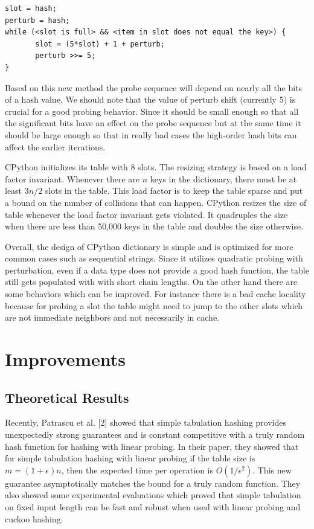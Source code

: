 \documentclass[11pt]{article}
\begin{document}
\begin{verbatim}
slot = hash;
perturb = hash;
while (<slot is full> && <item in slot does not equal the key>) {
       slot = (5*slot) + 1 + perturb;
       perturb >>= 5;
}
\end{verbatim}

Based on this new method the probe sequence will depend on nearly all the bits
of a hash value. We should note that the value of  perturb shift (currently 5)
is crucial for a good probing behavior. Since it should be small enough so that
all the significant bits have an  effect on the probe sequence but at the same
time it should be large enough so that in really bad cases the high-order hash
bits can affect the earlier iterations.

CPython initializes its table with 8 slots. The resizing strategy is based on a
load factor invariant. Whenever there are $n$ keys in the dictionary, there must
be at least $3n/2$ slots in the table. This load factor is to keep the table
sparse and put a bound on the number of collisions that can happen. CPython
resizes the size of table whenever the load factor invariant gets violated. It
quadruples the size when there are less than 50,000 keys in the table and
doubles the size otherwise. 

Overall, the design of CPython dictionary is simple and is optimized for more
common cases such as sequential strings. Since it utilizes quadratic probing
with perturbation, even if a data type does not provide a good hash function,
the table still gets populated with with short chain lengths.  On the other hand
there are some behaviors which can be improved. For instance there is a bad
cache locality because for probing a slot the table might need to jump to the
other slots which are not immediate neighbors and not necessarily in cache. 

\section{Improvements}

\subsection{Theoretical Results}
Recently, Patrascu et al. [2] showed that simple tabulation hashing provides unexpectedly strong guarantees and is constant competitive with a truly random hash function for hashing with linear probing. In their paper, they showed that for simple tabulation hashing with linear probing if the table size is $m = (1 + \epsilon)n$, then the expected time per operation is $O(1/\epsilon^2)$. This new guarantee asymptotically matches the
bound for a truly random function. They also showed some experimental evaluations which proved that simple tabulation on fixed input length can be fast and robust when used with linear probing and cuckoo hashing. 
\end{document}
